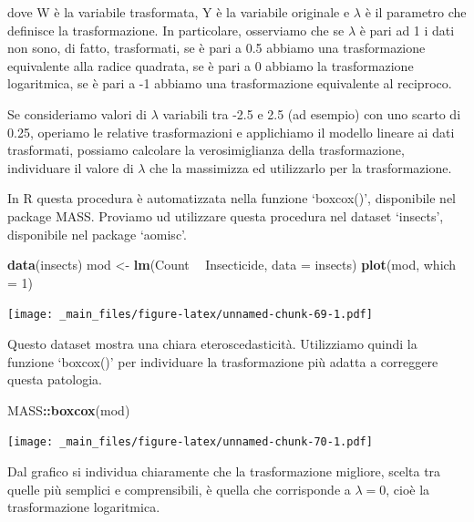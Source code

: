 \documentclass[a4paper,12pt,oneside]{book}
\newenvironment{Shaded}{\begin{snugshade}}{\end{snugshade}}
\newcommand{\KeywordTok}[1]{\textcolor[rgb]{0.13,0.29,0.53}{\textbf{#1}}}
\newcommand{\DataTypeTok}[1]{\textcolor[rgb]{0.13,0.29,0.53}{#1}}
\newcommand{\DecValTok}[1]{\textcolor[rgb]{0.00,0.00,0.81}{#1}}
\newcommand{\StringTok}[1]{\textcolor[rgb]{0.31,0.60,0.02}{#1}}
\newcommand{\OperatorTok}[1]{\textcolor[rgb]{0.81,0.36,0.00}{\textbf{#1}}}
\newcommand{\NormalTok}[1]{#1}
\theoremstyle{definition}
\theoremstyle{definition}
\theoremstyle{definition}
\theoremstyle{remark}
\begin{document}
dove W è la variabile trasformata, Y è la variabile originale e
\(\lambda\) è il parametro che definisce la trasformazione. In
particolare, osserviamo che se \(\lambda\) è pari ad 1 i dati non sono,
di fatto, trasformati, se è pari a 0.5 abbiamo una trasformazione
equivalente alla radice quadrata, se è pari a 0 abbiamo la
trasformazione logaritmica, se è pari a -1 abbiamo una trasformazione
equivalente al reciproco.

Se consideriamo valori di \(\lambda\) variabili tra -2.5 e 2.5 (ad
esempio) con uno scarto di 0.25, operiamo le relative trasformazioni e
applichiamo il modello lineare ai dati trasformati, possiamo calcolare
la verosimiglianza della trasformazione, individuare il valore di
\(\lambda\) che la massimizza ed utilizzarlo per la trasformazione.

In R questa procedura è automatizzata nella funzione `boxcox()',
disponibile nel package MASS. Proviamo ud utilizzare questa procedura
nel dataset `insects', disponibile nel package `aomisc'.

\begin{Shaded}
\begin{Highlighting}[]
\KeywordTok{data}\NormalTok{(insects)}
\NormalTok{mod <-}\StringTok{ }\KeywordTok{lm}\NormalTok{(Count }\OperatorTok{~}\StringTok{ }\NormalTok{Insecticide, }\DataTypeTok{data =}\NormalTok{ insects)}
\KeywordTok{plot}\NormalTok{(mod, }\DataTypeTok{which =} \DecValTok{1}\NormalTok{)}
\end{Highlighting}
\end{Shaded}

\texttt{[image: \_main\_files/figure-latex/unnamed-chunk-69-1.pdf]}

Questo dataset mostra una chiara eteroscedasticità. Utilizziamo quindi
la funzione `boxcox()' per individuare la trasformazione più adatta a
correggere questa patologia.

\begin{Shaded}
\begin{Highlighting}[]
\NormalTok{MASS}\OperatorTok{::}\KeywordTok{boxcox}\NormalTok{(mod)}
\end{Highlighting}
\end{Shaded}

\texttt{[image: \_main\_files/figure-latex/unnamed-chunk-70-1.pdf]}

Dal grafico si individua chiaramente che la trasformazione migliore,
scelta tra quelle più semplici e comprensibili, è quella che corrisponde
a \(\lambda = 0\), cioè la trasformazione logaritmica.
\end{document}
